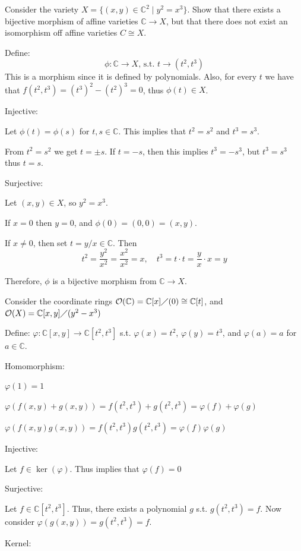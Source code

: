 \documentclass[12pt, letterpaper]{article}
\newcommand{\C}{\mathbb{C}}
\renewcommand{\t}[1]{\text{#1}}
\begin{document}
\begin{problem}{}
    Consider the variety $X = \{(x,y) \in \C^2 \mid y^2 = x^3\}$. Show that there exists a bijective morphism of affine varieties $\C \to X$,
    but that there does not exist an isomorphism off affine varieties $C \cong X$.
\end{problem}
\begin{problemproof}
    Define:
    \[\phi : \C \to X \t{, s.t. } t \to (t^2, t^3)\]
    This is a morphism since it is defined by polynomials. Also, for every $t$ we have that $f(t^2,t^3)=(t^3)^2-(t^2)^3=0$, thus $\phi(t) \in X$.

    Injective:

    Let $\phi(t)=\phi(s)$ for $t,s \in \C$. This implies that $t^2=s^2$ and $t^3=s^3$.

    From $t^2=s^2$ we get $t=\pm s$. If $t=-s$, then this implies $t^3=-s^3$, but $t^3=s^3$ thus $t=s$.

    Surjective:

    Let $(x,y) \in X$, so $y^2=x^3$.

    If $x=0$ then $y=0$, and $\phi(0)=(0,0)=(x,y)$.

    If $x\neq 0$, then set  $t=y/x \in \C$. Then
    \[t^2=\frac{y^2}{x^2}=\frac{x^2}{x^2}=x, \quad t^3=t \cdot t = \frac{y}{x} \cdot x = y\]

    Therefore, $\phi$ is a bijective morphism from $\C \to X$.

    Consider the coordinate rings $\mathcal{O}(\C) = \C[x] \diagup (0) \cong \C[t]$, and $\mathcal{O}(X) = \C[x,y] \diagup (y^2-x^3)$

    Define: $\varphi : \C[x,y] \to \C[t^2,t^3]$ s.t. $\varphi(x)=t^2$, $\varphi(y)=t^3$, and $\varphi(a)=a$ for $a \in \C$.

    Homomorphism:

    $\varphi(1)=1$

    $\varphi(f(x,y)+g(x,y))=f(t^2,t^3)+g(t^2,t^3)=\varphi(f)+\varphi(g)$

    $\varphi(f(x,y)g(x,y))=f(t^2,t^3)g(t^2,t^3)=\varphi(f)\varphi(g)$

    Injective:

    Let $f \in \ker(\varphi)$. Thus implies that $\varphi(f)=0$

    Surjective:

    Let $f \in \C[t^2,t^3]$. Thus, there exists a polynomial $g$ s.t. $g(t^2,t^3)=f$. Now consider $\varphi(g(x,y))=g(t^2,t^3)=f$.

    Kernel:


\end{problemproof}
\end{document}
